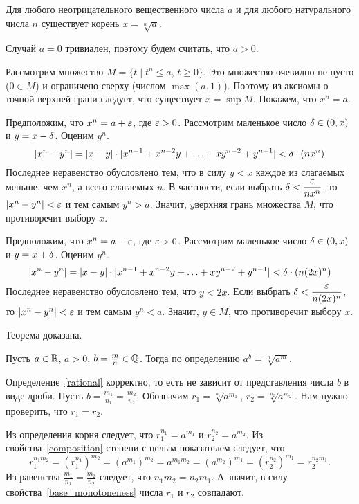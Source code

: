 \documentclass[a4paper,12pt,fleqn]{article}
\begin{document}
Для любого неотрицательного вещественного числа $a$ и для любого натурального числа $n$ существует корень $x=\sqrt[n]a$.

Случай $a=0$ тривиален, поэтому будем считать, что $a > 0$.

Рассмотрим множество $M = \{t \mid t^n \le a,\, t\ge 0\}$. Это множество очевидно не пусто ($0 \in M$) и ограничено сверху (числом $\max(a,1)$). Поэтому из аксиомы о точной верхней грани следует, что существует $x = \sup M$. Покажем, что $x^n = a$.

Предположим, что $x^n = a + \varepsilon$, где $\varepsilon > 0$. Рассмотрим маленькое число $\delta \in (0, x)$ и $y = x - \delta$. Оценим $y^n$.
\[
|x^n - y^n| = |x-y|\cdot|x^{n-1} + x^{n-2}y + \ldots + xy^{n-2} + y^{n-1}| < \delta \cdot (nx^n)
\]
Последнее неравенство обусловлено тем, что в силу $y < x$ каждое из слагаемых меньше, чем $x^n$, а всего слагаемых $n$.
В частности, если выбрать $\delta < \dfrac{\varepsilon}{nx^n}$, то $|x^n - y^n| < \varepsilon$ и тем самым $y^n > a$. Значит, $y$\т верхняя грань множества $M$, что противоречит выбору $x$.

Предположим, что $x^n = a - \varepsilon$, где $\varepsilon > 0$. Рассмотрим маленькое число $\delta \in (0, x)$ и $y = x + \delta$. Оценим $y^n$.
\[
|x^n - y^n| = |x-y|\cdot|x^{n-1} + x^{n-2}y + \ldots + xy^{n-2} + y^{n-1}| < \delta \cdot (n(2x)^n)
\]
Последнее неравенство обусловлено тем, что $y < 2x$.
Если выбрать $\delta < \dfrac{\varepsilon}{n(2x)^n}$, то $|x^n - y^n| < \varepsilon$ и тем самым $y^n < a$. Значит, $y\in M$, что противоречит выбору $x$.

Теорема доказана.

\label{rational}
Пусть $a\in\mathbb{R}$, $a > 0$, $b = \frac{m}{n} \in \mathbb{Q}$. Тогда по определению $a^b = \sqrt[n]{a^m}$.

Определение~\ref{rational} корректно, то есть не зависит от представления числа $b$ в виде дроби.
Пусть $b = \frac{m_1}{n_1} = \frac{m_2}{n_2}$. Обозначим $r_1 = \sqrt[n_1]{a^{m_1}}$, $r_2 = \sqrt[n_2]{a^{m_2}}$. Нам нужно проверить, что $r_1 = r_2$.

Из определения корня следует, что $r_1^{n_1} = a^{m_1}$ и $r_2^{n_2} = a^{m_2}$. Из свойства~\ref{composition} степени с целым показателем следует, что
\[
r_1^{n_1 m_2} = (r_1^{n_1})^{m_2} = (a^{m_1})^{m_2} = a^{m_1 m_2} = (a^{m_2})^{m_1} = (r_2^{n_2})^{m_1} = r_2^{n_2 m_1}.
\]
Из равенства $\frac{m_1}{n_1} = \frac{m_2}{n_2}$ следует, что $n_1 m_2 = n_2 m_1$. А значит, в силу свойства~\ref{base_monotoneness} числа $r_1$ и $r_2$ совпадают.
\end{document}
